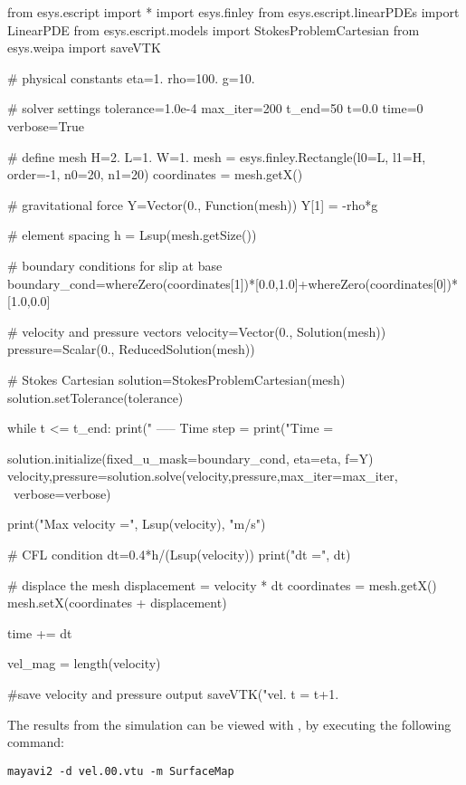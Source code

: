 \begin{python}
  from esys.escript import *
  import esys.finley
  from esys.escript.linearPDEs import LinearPDE
  from esys.escript.models import StokesProblemCartesian
  from esys.weipa import saveVTK

  # physical constants
  eta=1.
  rho=100.
  g=10.

  # solver settings
  tolerance=1.0e-4
  max_iter=200
  t_end=50
  t=0.0
  time=0
  verbose=True

  # define mesh
  H=2.
  L=1.
  W=1.
  mesh = esys.finley.Rectangle(l0=L, l1=H, order=-1, n0=20, n1=20)
  coordinates = mesh.getX()

  # gravitational force
  Y=Vector(0., Function(mesh))
  Y[1] = -rho*g

  # element spacing
  h = Lsup(mesh.getSize())

  # boundary conditions for slip at base
  boundary_cond=whereZero(coordinates[1])*[0.0,1.0]+whereZero(coordinates[0])*[1.0,0.0]

  # velocity and pressure vectors
  velocity=Vector(0., Solution(mesh))
  pressure=Scalar(0., ReducedSolution(mesh))

  # Stokes Cartesian
  solution=StokesProblemCartesian(mesh)
  solution.setTolerance(tolerance)

  while t <= t_end:
    print(" ----- Time step = %
    print("Time = %

    solution.initialize(fixed_u_mask=boundary_cond, eta=eta, f=Y)
    velocity,pressure=solution.solve(velocity,pressure,max_iter=max_iter, \
                                     verbose=verbose)

    print("Max velocity =", Lsup(velocity), "m/s")

    # CFL condition
    dt=0.4*h/(Lsup(velocity))
    print("dt =", dt)

    # displace the mesh
    displacement = velocity * dt
    coordinates = mesh.getX()
    mesh.setX(coordinates + displacement)

    time += dt

    vel_mag = length(velocity)

    #save velocity and pressure output
    saveVTK("vel.%
    t = t+1.
\end{python}
%
The results from the simulation can be viewed with \mayavi, by executing the
following command:
%
\begin{verbatim}
mayavi2 -d vel.00.vtu -m SurfaceMap
\end{verbatim}
